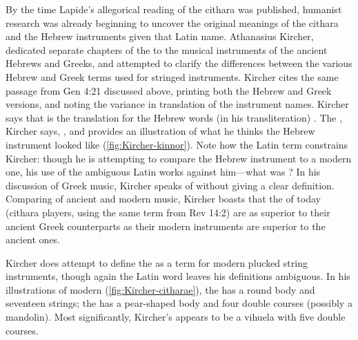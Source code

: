 By the time Lapide's allegorical reading of the cithara was published, humanist research was already beginning to uncover the original meanings of the cithara and the Hebrew instruments given that Latin name.
Athanasius Kircher, dedicated separate chapters of the  to the musical instruments of the ancient Hebrews and Greeks, and attempted to clarify the differences between the various Hebrew and Greek terms used for stringed instruments.
Kircher cites the same passage from Gen 4:21 discussed above, printing both the Hebrew and Greek versions, and noting the variance in translation of the instrument names.
Kircher says that  is the translation for the Hebrew words (in his transliteration) .
The , Kircher says, , and provides an illustration of what he thinks the Hebrew instrument looked like (\cref{fig:Kircher-kinnor}).%
	\autocite[I:~44--49]{Kircher:Musurgia}
Note how the Latin term constrains Kircher: though he is attempting to compare the Hebrew instrument to a modern one, his use of the ambiguous Latin  works against him---what was ?
In his discussion of Greek music, Kircher speaks of  without giving a clear definition.
Comparing of ancient and modern music, Kircher boasts that the  of today (cithara players, using the same term from Rev 14:2) are as superior to their ancient Greek counterparts as their modern instruments are superior to the ancient ones.
	\autocite[I:~548]{Kircher:Musurgia}

Kircher does attempt to define the  as a term for modern plucked string instruments, though again the Latin word leaves his definitions ambiguous.
In his illustrations of modern  (\cref{fig:Kircher-citharae}), the  has a round body and seventeen strings; the  has a pear-shaped body and four double courses (possibly a mandolin).
Most significantly, Kircher's  appears to be a vihuela with five double courses.



